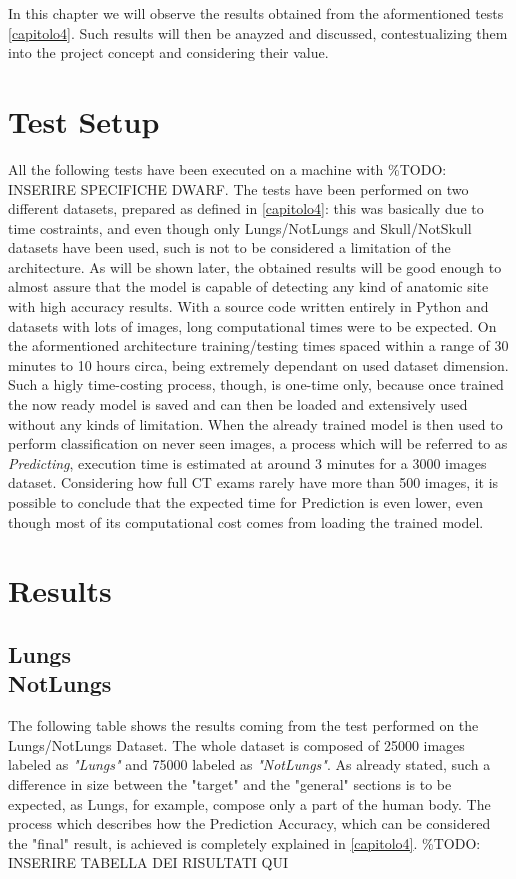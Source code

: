\documentclass[../main.tex]{subfiles}
\begin{document}
\label{capitolo6}
\thispagestyle{empty}

In this chapter we will observe the results obtained from the aformentioned tests \ref{capitolo4}. Such results will then be anayzed and discussed, contestualizing them into the project concept and considering their value.

\section{Test Setup}
All the following tests have been executed on a machine with \%TODO: INSERIRE SPECIFICHE DWARF.
The tests have been performed on two different datasets, prepared as defined in \ref{capitolo4}: this was basically due to time costraints, and even though only Lungs/NotLungs and Skull/NotSkull datasets have been used, such is not to be considered a limitation of the architecture. As will be shown later, the obtained results will be good enough to almost assure that the model is capable of detecting any kind of anatomic site with high accuracy results.
With a source code written entirely in Python and datasets with lots of images, long computational times were to be expected. On the aformentioned architecture training/testing times spaced within a range of 30 minutes to 10 hours circa, being extremely dependant on used dataset dimension. Such a higly time-costing process, though, is one-time only, because once trained the now ready model is saved and can then be loaded and extensively used without any kinds of limitation. When the already trained model is then used to perform classification on never seen images, a process which will be referred to as \textit{Predicting}, execution time is estimated at around 3 minutes for a 3000 images dataset. Considering how full CT exams rarely have more than 500 images, it is possible to conclude that the expected time for Prediction is even lower, even though most of its computational cost comes from loading the trained model.

\section{Results}
\subsection{Lungs\\NotLungs}
The following table shows the results coming from the test performed on the Lungs/NotLungs Dataset. The whole dataset is composed of 25000 images labeled as \textit{"Lungs"} and 75000 labeled as \textit{"NotLungs"}. As already stated, such a difference in size between the "target" and the "general" sections is to be expected, as Lungs, for example, compose only a part of the human body. The process which describes how the Prediction Accuracy, which can be considered the "final" result, is achieved is completely explained in \ref{capitolo4}.
\%TODO: INSERIRE TABELLA DEI RISULTATI QUI
\end{document}
